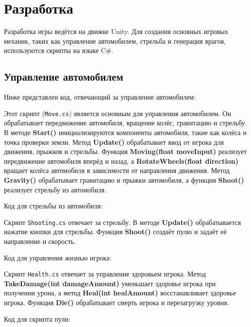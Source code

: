 \section{Разработка}

Разработка игры ведётся на движке Unity.
Для создания основных игровых механик,
таких как управление автомобилем, стрельба и генерация врагов,
используются скрипты на языке C\#.

\subsection{Управление автомобилем}

Ниже представлен код, отвечающий за управление автомобилем:


Этот скрипт (\texttt{Move.cs}) является основным для управления автомобилем.
Он обрабатывает передвижение автомобиля, вращение колёс, гравитацию и стрельбу.
В методе \textbf{Start()} инициализируются компоненты автомобиля,
такие как колёса и точка проверки земли. Метод \textbf{Update()}
обрабатывает ввод от игрока для движения, прыжков и стрельбы.
Функция \textbf{Moving(float moveInput)} реализует передвижение
автомобиля вперёд и назад, а \textbf{RotateWheels(float direction)}
вращает колёса автомобиля в зависимости от направления движения.
Метод \textbf{Gravity()} обрабатывает гравитацию и прыжки автомобиля,
а функция \textbf{Shoot()} реализует стрельбу из автомобиля.

Код для стрельбы из автомобиля:


Скрипт \texttt{Shooting.cs} отвечает за стрельбу.
В методе \textbf{Update()} обрабатывается нажатие кнопки для стрельбы.
Функция \textbf{Shoot()} создаёт пулю и задаёт её направление и скорость.

Код для управления жизнью игрока:


Скрипт \texttt{Health.cs} отвечает за управление здоровьем игрока.
Метод \textbf{TakeDamage(int damageAmount)} уменьшает здоровье игрока
при получении урона, а метод \textbf{Heal(int healAmount)} восстанавливает
здоровье игрока. Функция \textbf{Die()} обрабатывает смерть игрока
и перезагрузку уровня.

Код для скрипта пули:


